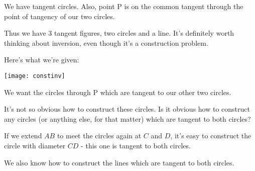 





We have tangent circles.  Also, point P is on the common tangent through the point of tangency of our two circles.

Thus we have 3 tangent figures, two circles and a line.  It's definitely worth thinking about inversion, even though it's a construction problem.

Here's what we're given:

\begin{center}
    \texttt{[image: constinv]}    
\end{center}

We want the circles through P which are tangent to our other two circles.

It's not so obvious how to construct these circles.  Is it obvious how to construct any circles (or anything else, for that matter) which are tangent to both circles?


If we extend $AB$ to meet the circles again at $C$ and $D$, it's easy to construct the circle with diameter $CD$ - this one is tangent to both circles.

We also know how to construct the lines which are tangent to both circles.

